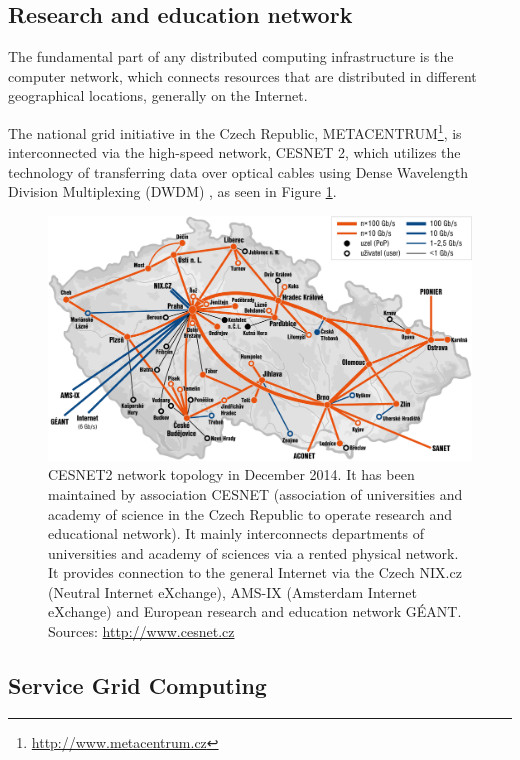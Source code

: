 \subsection{Research and education network}
The fundamental part of any distributed computing infrastructure is the computer network, which connects resources that are distributed in different geographical locations, generally on the Internet. 

The national grid initiative in the Czech Republic, METACENTRUM\footnote{\url{http://www.metacentrum.cz}}, is interconnected via the high-speed network, CESNET 2, which utilizes the technology of transferring data over optical cables using Dense Wavelength Division Multiplexing (DWDM) \cite{novak2007deployment}, as seen in Figure \ref{fig:cesnet}.

\begin{figure}[ht]
    \centering
    \includegraphics[width=1\textwidth]{chapter2/cesnet2-topo1.png}
    \caption{CESNET2 network topology in December 2014. It has been maintained by association CESNET (association of universities and academy of science in the Czech Republic to operate research and educational network). It mainly interconnects departments of universities and academy of sciences via a rented physical network. It provides connection to the general Internet via the Czech NIX.cz (Neutral Internet eXchange), AMS-IX (Amsterdam Internet eXchange) and European research and education network GÉANT. Sources: \url{http://www.cesnet.cz}}
    \label{fig:cesnet}
\end{figure}

\subsection{Service Grid Computing}
\label{sec:servicegrid}

